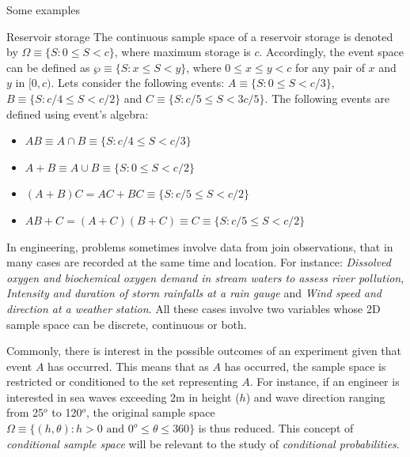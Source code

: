 \documentclass[8pt]{beamer}
\begin{document}
\begin{frame}{Some examples}

    \begin{exampleblock}{Reservoir storage}
        The continuous sample space of a reservoir storage is denoted by $\Omega \equiv \{ S: 0 \leq S < c \}$, where maximum storage is $c$. Accordingly, the event space can be defined as $\wp \equiv \{ S: x \leq S < y \}$, where $0 \leq x \leq y < c$ for any pair of $x$ and $y$ in $[0,c)$. Lets consider the following events: $A \equiv \{ S: 0 \leq S < c/3 \}$, $B \equiv \{ S: c/4 \leq S < c/2 \}$ and $C \equiv \{ S: c/5 \leq S < 3c/5 \}$. The following events are defined using event's algebra:
        \begin{itemize}
            \item $AB \equiv A \cap B \equiv \{ S: c/4 \leq S < c/3 \}$ 
            \item $A + B \equiv A \cup B \equiv \{ S: 0 \leq S < c/2 \}$ 
            \item $(A + B) C = AC + BC \equiv \{ S: c/5 \leq S < c/2 \}$ 
            \item $AB + C = (A + C) (B + C) \equiv C \equiv \{ S: c/5 \leq S < c/2 \}$ 
        \end{itemize}

    \end{exampleblock}
    In engineering, problems sometimes involve data from join observations, that in many cases are recorded at the same time and location. For instance: \emph{Dissolved oxygen and biochemical oxygen demand in stream waters to assess river pollution}, \emph{Intensity and duration of storm rainfalls at a rain gauge} and \emph{Wind speed and direction at a weather station}. All these cases involve two variables whose 2D sample space can be discrete, continuous or both. 

    Commonly, there is interest in the possible outcomes of an experiment given that event $A$ has occurred. This means that as $A$ has occurred, the sample space is restricted or conditioned to the set representing $A$. For instance, if an engineer is interested in sea waves exceeding 2m in height ($h$) and wave direction ranging from 25$^o$ to 120$^o$, the original sample space $\Omega \equiv \{ (h, \theta) : h > 0 \text{ and } 0^o \leq \theta \leq 360 \}$    is thus reduced. This concept of \emph{conditional sample space} will be relevant to the study of \emph{conditional probabilities}.  
\end{frame}
\end{document}
